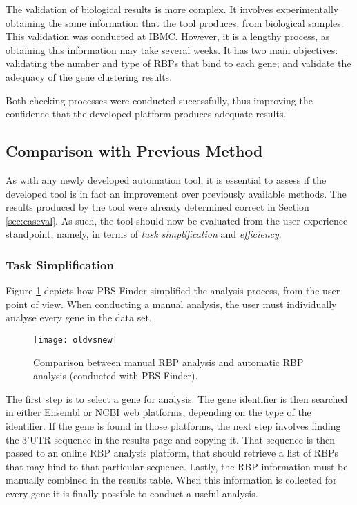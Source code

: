 The validation of biological results is more complex. It involves experimentally
obtaining the same information that the tool produces, from biological samples.
This validation was conducted at IBMC. However, it is a lengthy process, as
obtaining this information may take several weeks. It has two main objectives:
validating the number and type of RBPs that bind to each gene; and validate the
adequacy of the gene clustering results.

Both checking processes were conducted successfully, thus improving the
confidence that the developed platform produces adequate results.

\subsection{Comparison with Previous Method}\label{sec:caseperf}

As with any newly developed automation tool, it is essential to assess if the
developed tool is in fact an improvement over previously available methods. The
results produced by the tool were already determined correct in Section
\ref{sec:caseval}. As such, the tool should now be evaluated from the user
experience standpoint, namely, in terms of \emph{task simplification} and
\emph{efficiency}.

\subsubsection*{Task Simplification}

Figure \ref{fig:oldvsnew} depicts how PBS Finder simplified the analysis process,
from the user point of view. When conducting a manual analysis, the user must
individually analyse every gene in the data set.

\begin{figure}[!htb]
  \begin{center}
    \leavevmode
    \texttt{[image: oldvsnew]}
    \caption[Comparison between manual RBP analysis and automatic RBP analysis (conducted with PBS Finder)]{
      Comparison between manual RBP analysis and automatic RBP analysis
      (conducted with PBS Finder).
    }
    \label{fig:oldvsnew}
  \end{center}
\end{figure}

The first step is to select a gene for analysis. The gene identifier is then
searched in either Ensembl or NCBI web platforms, depending on the type of the
identifier. If the gene is found in those platforms, the next step involves
finding the 3'UTR sequence in the results page and copying it. That sequence is
then passed to an online RBP analysis platform, that should retrieve a list of
RBPs that may bind to that particular sequence. Lastly, the RBP information must
be manually combined in the results table. When this information is collected
for every gene it is finally possible to conduct a useful analysis.

